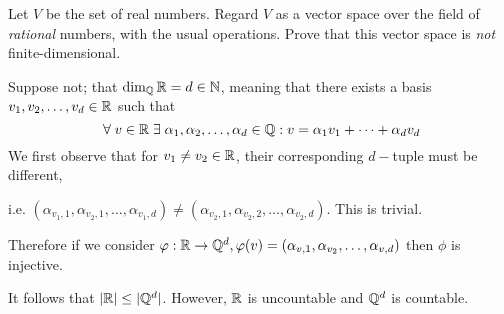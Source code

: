 \documentclass[a4paper, 11pt]{article}
\begin{document}
\begin{problem} 
Let \(V\) be the set of real numbers. Regard \(V\) as a vector space over the field of \textit{rational} numbers, with the usual operations. Prove that this vector space is \textit{not} finite-dimensional.
\end{problem}
\begin{solution}
    Suppose not; that \(\dim_{\mathbb{Q}} \mathbb{R} = d \in \mathbb{N}\), meaning that there exists a basis \(v_1, v_2, \dots, v_d \in \mathbb{R}\) such that \[
        \forall v \in \bbr \exists \alpha_1, \alpha_2, \dots, \alpha_d \in \bbq: v = \alpha_1v_1 + \dots + \alpha_dv_d
    \]
    We first observe that for \(v_1 \neq v_2 \in \mathbb{R}\), their corresponding \(d-\)tuple must be different,

    i.e. \((\alpha_{v_1, 1}, \alpha_{v_2, 1}, \dots, \alpha_{v_1, d}) \neq (\alpha_{v_2, 1}, \alpha_{v_2, 2}, \dots, \alpha_{v_2, d})\). This is trivial.

    Therefore if we consider \(\varphi: \mathbb{R} \to \mathbb{Q}^d, \varphi(v) = (\alpha_{v, 1}, \alpha_{v_2}, \dots, \alpha_{v, d})\) then \(\phi\) is injective. 

    It follows that \(\lvert\mathbb{R}\rvert \leq \lvert\mathbb{Q}^d\rvert\). However, \(\mathbb{R}\) is uncountable and \(\mathbb{Q}^d\) is countable. \contra
\end{solution}
\end{document}

